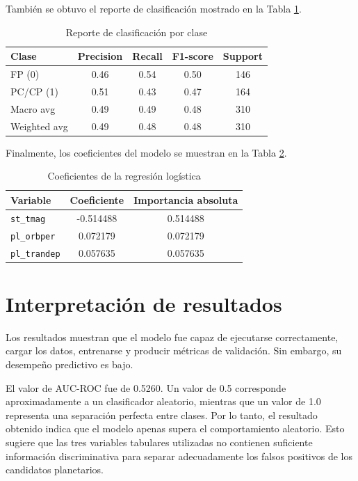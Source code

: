 \documentclass[12pt,letterpaper]{article}
\begin{document}
También se obtuvo el reporte de clasificación mostrado en la Tabla \ref{tab:classification}.

\begin{table}[H]
\centering
\caption{Reporte de clasificación por clase}
\label{tab:classification}
\begin{tabular}{lcccc}
\toprule
\textbf{Clase} & \textbf{Precision} & \textbf{Recall} & \textbf{F1-score} & \textbf{Support} \\
\midrule
FP (0) & 0.46 & 0.54 & 0.50 & 146 \\
PC/CP (1) & 0.51 & 0.43 & 0.47 & 164 \\
\midrule
Macro avg & 0.49 & 0.49 & 0.48 & 310 \\
Weighted avg & 0.49 & 0.48 & 0.48 & 310 \\
\bottomrule
\end{tabular}
\end{table}

Finalmente, los coeficientes del modelo se muestran en la Tabla \ref{tab:coeficientes}.

\begin{table}[H]
\centering
\caption{Coeficientes de la regresión logística}
\label{tab:coeficientes}
\begin{tabular}{lcc}
\toprule
\textbf{Variable} & \textbf{Coeficiente} & \textbf{Importancia absoluta} \\
\midrule
\texttt{st\_tmag} & -0.514488 & 0.514488 \\
\texttt{pl\_orbper} & 0.072179 & 0.072179 \\
\texttt{pl\_trandep} & 0.057635 & 0.057635 \\
\bottomrule
\end{tabular}
\end{table}

\section{Interpretación de resultados}

Los resultados muestran que el modelo fue capaz de ejecutarse correctamente, cargar los datos, entrenarse y producir métricas de validación. Sin embargo, su desempeño predictivo es bajo.

El valor de AUC-ROC fue de 0.5260. Un valor de 0.5 corresponde aproximadamente a un clasificador aleatorio, mientras que un valor de 1.0 representa una separación perfecta entre clases. Por lo tanto, el resultado obtenido indica que el modelo apenas supera el comportamiento aleatorio. Esto sugiere que las tres variables tabulares utilizadas no contienen suficiente información discriminativa para separar adecuadamente los falsos positivos de los candidatos planetarios.
\end{document}
